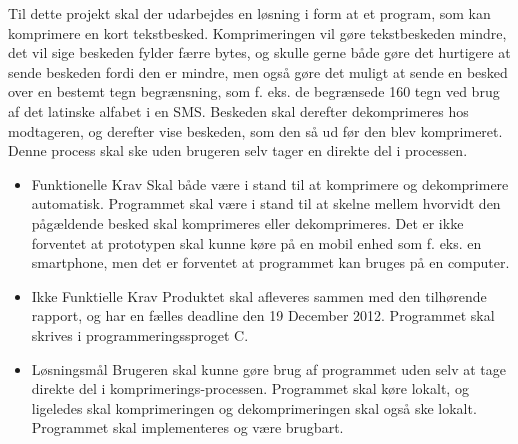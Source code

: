 Til dette projekt skal der udarbejdes en løsning i form at et program, som kan komprimere en kort tekstbesked. Komprimeringen vil gøre tekstbeskeden mindre, det vil sige beskeden fylder færre bytes, og skulle gerne både gøre det hurtigere at sende beskeden fordi den er mindre, men også gøre det muligt at sende en besked over en bestemt tegn begrænsning, som f. eks. de begrænsede 160 tegn ved brug af det latinske alfabet i en SMS. Beskeden skal derefter dekomprimeres hos modtageren, og derefter vise beskeden, som den så ud før den blev komprimeret. Denne process skal ske uden brugeren selv tager en direkte del i processen.

\begin {itemize}
\item Funktionelle Krav
\subitem Skal både være i stand til at komprimere og dekomprimere automatisk.
\subitem Programmet skal være i stand til at skelne mellem hvorvidt den pågældende besked skal komprimeres eller dekomprimeres.
\subitem Det er ikke forventet at prototypen skal kunne køre på en mobil enhed som f. eks. en smartphone, men det er forventet at programmet kan bruges på en computer.

\item Ikke Funktielle Krav
\subitem Produktet skal afleveres sammen med den tilhørende rapport, og har en fælles deadline den 19 December 2012.
\subitem Programmet skal skrives i programmeringssproget C.

\item Løsningsmål
\subitem Brugeren skal kunne gøre brug af programmet uden selv at tage direkte del i komprimerings-processen.
\subitem Programmet skal køre lokalt, og ligeledes skal komprimeringen og dekomprimeringen skal også ske lokalt.
\subitem Programmet skal implementeres og være brugbart.
\end{itemize}